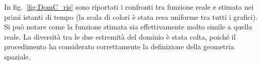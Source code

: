 \documentclass[a4paper,11pt,twoside,openright]{book}							%
\begin{document}
In fig.~\ref{fig:DomC_ris} sono riportati i confronti tra funzione reale e stimata nei primi istanti di tempo (la scala di colori è stata resa uniforme tra tutti i grafici). Si può notare come la funzione stimata sia effettivamente molto simile a quella reale. La diversità tra le due estremità del dominio è stata colta, poiché il procedimento ha considerato correttamente la definizione della geometria spaziale.
\newpage
\begin{figure}[H]
\centering
\end{figure}
\end{document}
